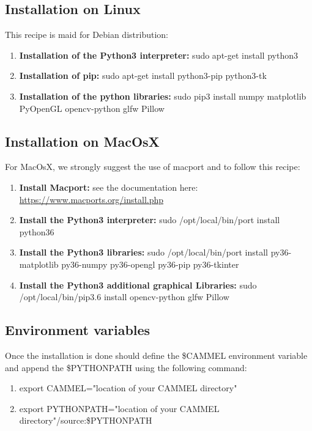 \documentclass[12pt,a4paper]{article}
\begin{document}
\subsection{Installation on Linux}
This recipe is maid for Debian distribution:
\begin{enumerate}
\item{\textbf{Installation of the Python3 interpreter:} sudo apt-get install python3}
\item{\textbf{Installation of pip:} sudo apt-get install python3-pip python3-tk}
\item{\textbf{Installation of the python libraries:} sudo pip3 install numpy matplotlib PyOpenGL opencv-python glfw Pillow}
\end{enumerate}

\subsection{Installation on MacOsX}
For MacOsX, we strongly suggest the use of macport and to follow this recipe:
\begin{enumerate}
\item{\textbf{Install Macport:} see the documentation here: \href{https://www.macports.org/install.php}{https://www.macports.org/install.php}}
\item{\textbf{Install the Python3 interpreter:} sudo /opt/local/bin/port install python36}
\item{\textbf{Install the Python3 libraries:} sudo /opt/local/bin/port install py36-matplotlib py36-numpy py36-opengl py36-pip py36-tkinter}
\item{\textbf{Install the Python3 additional graphical Libraries:} sudo /opt/local/bin/pip3.6 install opencv-python glfw Pillow}
\end{enumerate}

\subsection{Environment variables}
Once the installation is done should define the \$CAMMEL environment variable and append the \$PYTHONPATH using the following command:
\begin{enumerate}
\item{export CAMMEL="location of your CAMMEL directory"}
\item{export PYTHONPATH="location of your CAMMEL directory"/source:\$PYTHONPATH}
\end{enumerate}
\end{document}
